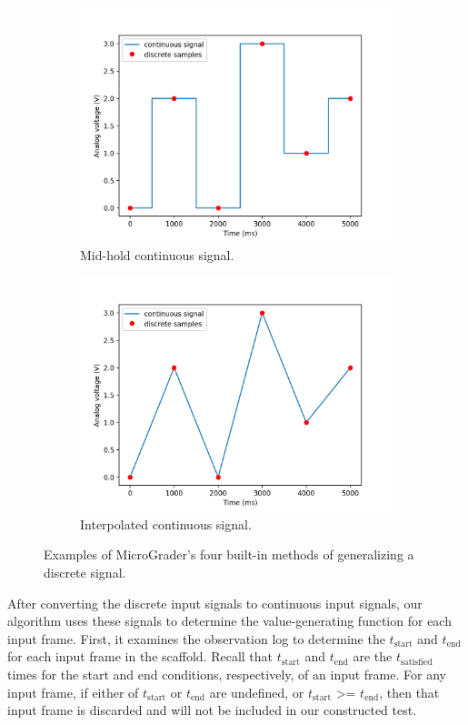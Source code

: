 \documentclass[12pt]{article}
\begin{document}
\begin{figure}
\begin{subfigure}[b]{.45\linewidth}
\includegraphics[width=\linewidth]{input-mid.png}
\caption{Mid-hold continuous signal.}
\end{subfigure}
\begin{subfigure}[b]{.45\linewidth}
\includegraphics[width=\linewidth]{input-inter.png}
\caption{Interpolated continuous signal.}
\end{subfigure}
\caption{Examples of MicroGrader's four built-in methods of generalizing a discrete signal.}
\label{fig:interpolation}
\end{figure}

After converting the discrete input signals to continuous input signals, our algorithm uses these signals to determine the value-generating function for each input frame.  First, it examines the observation log to determine the $t_{\text{start}}$ and $t_{\text{end}}$ for each input frame in the scaffold.  Recall that $t_{\text{start}}$ and $t_{\text{end}}$ are the $t_{\text{satisfied}}$ times for the start and end conditions, respectively, of an input frame.  For any input frame, if either of $t_{\text{start}}$ or $t_{\text{end}}$ are undefined, or $t_{\text{start}}$ >= $t_{\text{end}}$, then that input  frame is discarded and will not be included in our constructed test.
\end{document}
